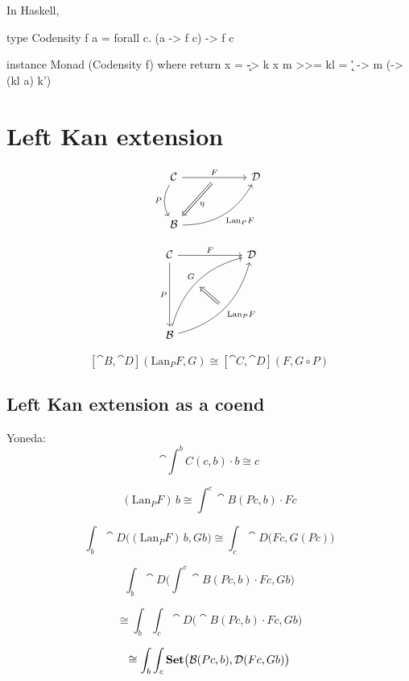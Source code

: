 \documentclass[DaoFP]{subfiles}
\begin{document}
In Haskell, 
 \begin{haskell}
type Codensity f a = forall c. (a -> f c) -> f c
 \end{haskell}

 \begin{haskell}
instance Monad (Codensity f) where
  return x = \k -> k x
  m >>= kl = \k' -> m (\a -> (kl a) k')
 \end{haskell}

\section{Left Kan extension}

\[
 \begin{tikzcd} [row sep=1cm, column sep=1cm]
 \cat C
 \arrow[rr, "F", "" {name=ID, below} ]
 \arrow[d, bend right, "P"']
 && \cat D
 \\
 \cat B
  \arrow[urr, bend right, "\text{Lan}_P F"']
 \arrow[Rightarrow, "\eta",  from=ID]
 \end{tikzcd}
\]

\[
\begin{tikzcd}[row sep=2cm, column sep=2cm]
\cat C  \ar[d, "P"', "" {name=P}]
            \ar[r, "F", ""  {name=F, below, near start, bend right}]
&
\cat D
\\
\cat B
    \ar[ur, bend left, "G", "" {name=G, below}]
    \ar[ur, bend right, "\text{Lan}_P F"', "" {name=Lan}]
\arrow[Rightarrow, "", from=Lan, to=G]
\end{tikzcd}
\]

\[ [\cat B, \cat D](\text{Lan}_P F , G) \cong  [\cat C, \cat D] (F, G \circ P) \]

\subsection{Left Kan extension as a coend}
Yoneda:
\[ \cat \int^b C(c, b) \cdot b \cong c \]

\[ (\text{Lan}_P F)\, b \cong \int^{c} \cat B(P c, b) \cdot F c \]

\[ \int_b \cat D\big((\text{Lan}_P F)\,b, G b\big) \cong \int_c \cat D\big(F c, G(Pc)\big) \]

\[ \int_b \cat D\Big( \int^{c} \cat B (P c, b) \cdot F c, G b \Big) \]

\[ \cong \int_b \int_c \cat D\big( \cat B (P c, b) \cdot F c, G b \big) \]

\[ \cong \int_b \int_c \mathbf{Set} \big( \mathcal{B} (P c, b), \mathcal{D} (F c, G b) \big) \]
\end{document}
